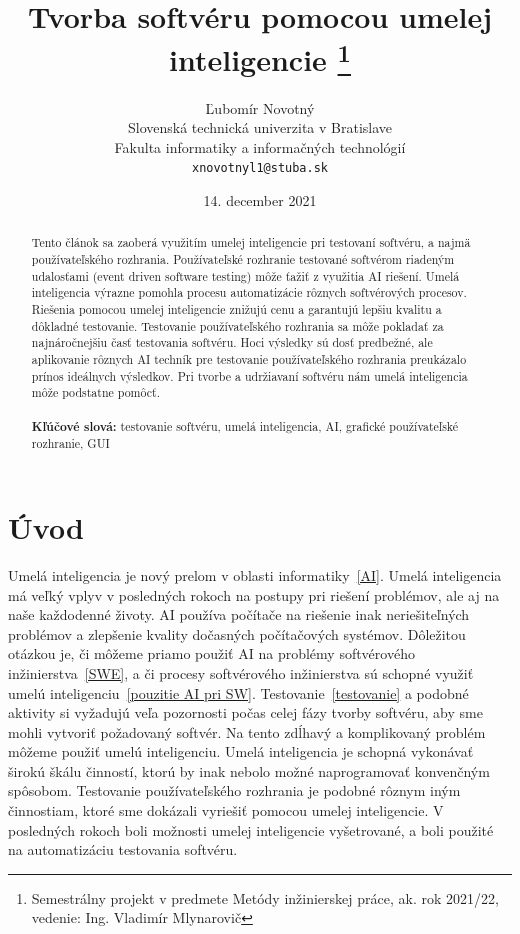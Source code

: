 \documentclass[10pt,twoside,slovak,a4paper]{article}
\title{Tvorba softvéru pomocou umelej inteligencie
\thanks{Semestrálny projekt v predmete Metódy inžinierskej práce, ak. rok 2021/22, vedenie: Ing. Vladimír Mlynarovič}} %
\author{Ľubomír Novotný\\[2pt]
	{\small Slovenská technická univerzita v Bratislave}\\
	{\small Fakulta informatiky a informačných technológií}\\
	{\small \texttt{xnovotnyl1@stuba.sk}}
	}
\date{\small 14. december 2021}
\begin{document}
\maketitle

\begin{abstract}

 Tento článok sa zaoberá využitím umelej inteligencie pri testovaní softvéru, a najmä používateľského rozhrania. Používateľské rozhranie testované softvérom riadeným udalosťami (event driven software testing) môže ťažiť z využitia AI riešení. Umelá inteligencia výrazne pomohla procesu automatizácie rôznych softvérových procesov. Riešenia pomocou umelej inteligencie znižujú cenu a garantujú lepšiu kvalitu a dôkladné testovanie. Testovanie používateľského rozhrania sa môže pokladať za najnáročnejšiu časť testovania softvéru. Hoci výsledky sú dosť predbežné, ale aplikovanie rôznych AI techník pre testovanie používateľského rozhrania preukázalo prínos ideálnych výsledkov. Pri tvorbe a udržiavaní softvéru nám umelá inteligencia môže podstatne pomôcť.\\\\
 \textbf{Kľúčové slová:} testovanie softvéru, umelá inteligencia, AI, grafické používateľské rozhranie, GUI
\end{abstract}

\section{Úvod}

Umelá inteligencia je nový prelom v oblasti informatiky~\ref{AI}. Umelá inteligencia má veľký vplyv v posledných rokoch na postupy pri riešení problémov, ale aj na naše každodenné životy. AI používa počítače na riešenie inak neriešiteľných problémov a zlepšenie kvality dočasných počítačových systémov. Dôležitou otázkou je, či môžeme priamo použiť AI na problémy softvérového inžinierstva~\ref{SWE}, a či procesy softvérového inžinierstva sú schopné využiť umelú inteligenciu~\ref{pouzitie AI pri SW}.
Testovanie~\ref{testovanie} a podobné aktivity si vyžadujú veľa pozornosti počas celej fázy tvorby softvéru, aby sme mohli vytvoriť požadovaný softvér. Na tento zdĺhavý a komplikovaný problém môžeme použiť umelú inteligenciu. Umelá inteligencia je schopná vykonávať širokú škálu činností, ktorú by inak nebolo možné naprogramovať konvenčným spôsobom. Testovanie používateľského rozhrania je podobné rôznym iným činnostiam, ktoré sme dokázali vyriešiť pomocou umelej inteligencie. V posledných rokoch boli možnosti umelej inteligencie vyšetrované, a boli použité na automatizáciu testovania softvéru.
\end{document}
